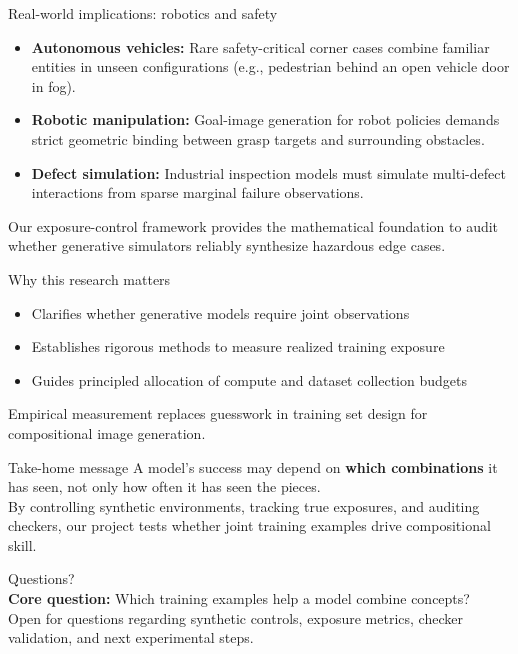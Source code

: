 \documentclass[aspectratio=169,11pt]{beamer}
\begin{document}
\begin{frame}{Real-world implications: robotics and safety}
\begin{itemize}
\item \textbf{Autonomous vehicles:} Rare safety-critical corner cases combine familiar entities in unseen configurations (e.g., pedestrian behind an open vehicle door in fog).
\item \textbf{Robotic manipulation:} Goal-image generation for robot policies demands strict geometric binding between grasp targets and surrounding obstacles.
\item \textbf{Defect simulation:} Industrial inspection models must simulate multi-defect interactions from sparse marginal failure observations.
\end{itemize}
\vspace{2mm}
\normalsize Our exposure-control framework provides the mathematical foundation to audit whether generative simulators reliably synthesize hazardous edge cases.
\end{frame}

\begin{frame}{Why this research matters}
\begin{itemize}
\item Clarifies whether generative models require joint observations
\item Establishes rigorous methods to measure realized training exposure
\item Guides principled allocation of compute and dataset collection budgets
\end{itemize}
\vspace{2mm}
\normalsize Empirical measurement replaces guesswork in training set design for compositional image generation.
\end{frame}

\begin{frame}{Take-home message}
\Large A model's success may depend on \textbf{which combinations} it has seen, not only how often it has seen the pieces.
\vspace{4mm}\\
\normalsize By controlling synthetic environments, tracking true exposures, and auditing checkers, our project tests whether joint training examples drive compositional skill.
\end{frame}

\begin{frame}{Questions?}
\vspace{6mm}\\
\normalsize
\textbf{Core question:} Which training examples help a model combine concepts?
\vspace{3mm}\\
{\small Open for questions regarding synthetic controls, exposure metrics, checker validation, and next experimental steps.}
\end{frame}
\end{document}
